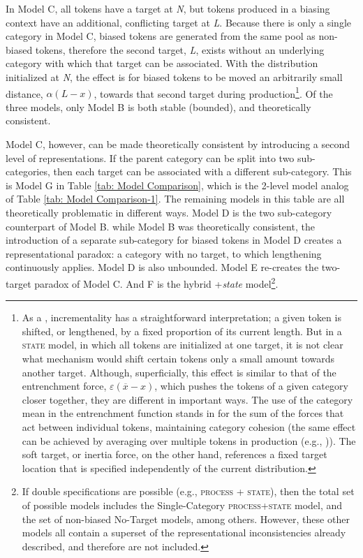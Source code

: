 In Model C, all tokens have a target at \emph{N}, but tokens produced
in a biasing context have an additional, conflicting target at \emph{L}.
Because there is only a single category in Model C, biased tokens
are generated from the same pool as non-biased tokens, therefore the
second target, \emph{L}, exists without an underlying category with
which that target can be associated. With the distribution initialized
at \emph{N}, the effect is for biased tokens to be moved an arbitrarily
small distance, $\alpha(L-x)$, towards that second target during
production\footnote{As a , incrementality has a straightforward interpretation;
a given token is shifted, or lengthened, by a fixed proportion of
its current length. But in a \textsc{state} model, in which all tokens
are initialized at one target, it is not clear what mechanism would
shift certain tokens only a small amount towards another target. Although,
superficially, this effect is similar to that of the entrenchment
force, $\varepsilon(\overline{x}-x)$, which pushes the tokens of
a given category closer together, they are different in important
ways. The use of the category mean in the entrenchment function stands
in for the sum of the forces that act between individual tokens, maintaining
category cohesion (the same effect can be achieved by averaging over
multiple tokens in production (e.g., \citealt{Pierrehumbert2000,Wedela})).
The soft target, or inertia force, on the other hand, references a
fixed target location that is specified independently of the current
distribution. }. Of the three models, only Model B is both stable (bounded), and
theoretically consistent. 

Model C, however, can be made theoretically consistent by introducing
a second level of representations. If the parent category can be split
into two sub-categories, then each target can be associated with a
different sub-category. This is Model G in Table \ref{tab: Model Comparison},
which is the 2-level model analog of Table \ref{tab: Model Comparison-1}.
The remaining models in this table are all theoretically problematic
in different ways. Model D is the two sub-category counterpart of
Model B. while Model B was theoretically consistent, the introduction
of a separate sub-category for biased tokens in Model D creates a
representational paradox: a category with no target, to which lengthening
continuously applies. Model D is also unbounded. Model E re-creates
the two-target paradox of Model C. And F is the hybrid +\emph{state}
model\footnote{If double specifications are possible (e.g., \textsc{process} + \textsc{state}),
then the total set of possible models includes the Single-Category
\textsc{process}+\textsc{state} model, and the set of non-biased No-Target
models, among others. However, these other models all contain a superset
of the representational inconsistencies already described, and therefore
are not included.}.

